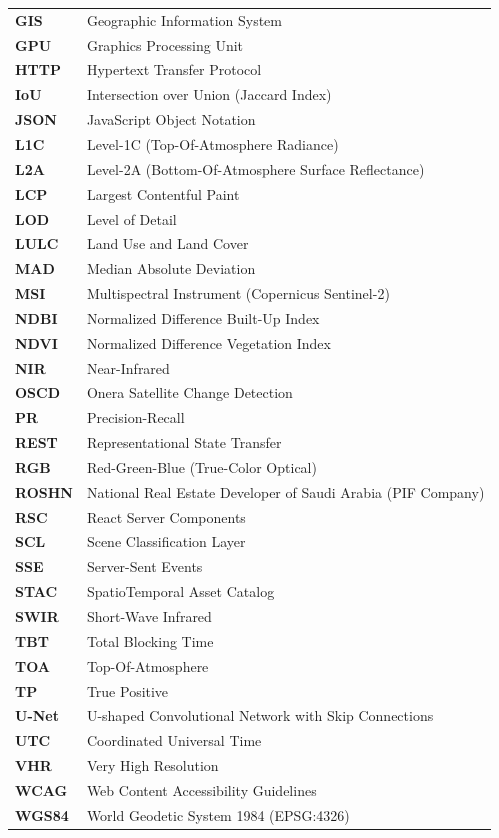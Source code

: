 \begin{longtable}{ll}
\textbf{GIS} & Geographic Information System \\
\textbf{GPU} & Graphics Processing Unit \\
\textbf{HTTP} & Hypertext Transfer Protocol \\
\textbf{IoU} & Intersection over Union (Jaccard Index) \\
\textbf{JSON} & JavaScript Object Notation \\
\textbf{L1C} & Level-1C (Top-Of-Atmosphere Radiance) \\
\textbf{L2A} & Level-2A (Bottom-Of-Atmosphere Surface Reflectance) \\
\textbf{LCP} & Largest Contentful Paint \\
\textbf{LOD} & Level of Detail \\
\textbf{LULC} & Land Use and Land Cover \\
\textbf{MAD} & Median Absolute Deviation \\
\textbf{MSI} & Multispectral Instrument (Copernicus Sentinel-2) \\
\textbf{NDBI} & Normalized Difference Built-Up Index \\
\textbf{NDVI} & Normalized Difference Vegetation Index \\
\textbf{NIR} & Near-Infrared \\
\textbf{OSCD} & Onera Satellite Change Detection \\
\textbf{PR} & Precision-Recall \\
\textbf{REST} & Representational State Transfer \\
\textbf{RGB} & Red-Green-Blue (True-Color Optical) \\
\textbf{ROSHN} & National Real Estate Developer of Saudi Arabia (PIF Company) \\
\textbf{RSC} & React Server Components \\
\textbf{SCL} & Scene Classification Layer \\
\textbf{SSE} & Server-Sent Events \\
\textbf{STAC} & SpatioTemporal Asset Catalog \\
\textbf{SWIR} & Short-Wave Infrared \\
\textbf{TBT} & Total Blocking Time \\
\textbf{TOA} & Top-Of-Atmosphere \\
\textbf{TP} & True Positive \\
\textbf{U-Net} & U-shaped Convolutional Network with Skip Connections \\
\textbf{UTC} & Coordinated Universal Time \\
\textbf{VHR} & Very High Resolution \\
\textbf{WCAG} & Web Content Accessibility Guidelines \\
\textbf{WGS84} & World Geodetic System 1984 (EPSG:4326) \\
\end{longtable}
\newpage
